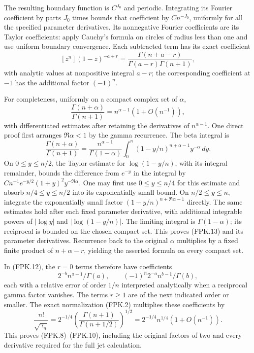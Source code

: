 The resulting boundary function is $C^{J_0}$ and periodic. Integrating
its Fourier coefficient by parts $J_0$ times bounds that coefficient
by $C n^{-J_0}$, uniformly for all the specified parameter derivatives.
Its nonnegative Fourier coefficients are its Taylor coefficients:
apply Cauchy's formula on circles of radius less than one and use
uniform boundary convergence. Each subtracted term has its exact
coefficient
\[
 [z^n](1-z)^{-a+r}
   =\frac{\Gamma(n+a-r)}{\Gamma(a-r)\Gamma(n+1)},
 \tag{FPK.12}
\]
with analytic values at nonpositive integral $a-r$; the corresponding
coefficient at $-1$ has the additional factor $(-1)^n$.

For completeness, uniformly on a compact complex set of $\alpha$,
\[
 \frac{\Gamma(n+\alpha)}{\Gamma(n+1)}
       =n^{\alpha-1}(1+O(n^{-1})),
 \tag{FPK.13}
\]
with differentiated estimates after retaining the derivatives of
$n^{\alpha-1}$. One direct proof first arranges
$\Re\alpha<1$ by the gamma recurrence. The beta integral is
\[
 \frac{\Gamma(n+\alpha)}{\Gamma(n+1)}
   =\frac{n^{\alpha-1}}{\Gamma(1-\alpha)}
     \int_0^n(1-y/n)^{n+\alpha-1}y^{-\alpha}\,dy.
\]
On $0\leq y\leq n/2$, the Taylor estimate for $\log(1-y/n)$,
with its integral remainder, bounds the difference from $e^{-y}$
in the integral by $C n^{-1}e^{-y/2}(1+y)^2y^{-\Re\alpha}$.
One may first use $0\leq y\leq n/4$ for this estimate and absorb
$n/4\leq y\leq n/2$ into its exponentially small bound. On
$n/2\leq y\leq n$, integrate the exponentially small factor
$(1-y/n)^{n+\Re\alpha-1}$ directly. The same estimates hold after
each fixed parameter derivative, with additional integrable powers
of $|\log y|$ and $|\log(1-y/n)|$. The limiting integral is
$\Gamma(1-\alpha)$; its reciprocal is bounded on the chosen compact
set. This proves (FPK.13) and its parameter derivatives. Recurrence
back to the original $\alpha$ multiplies by a fixed finite product
of $n+\alpha-r$, yielding the asserted formula on every compact set.

In (FPK.12), the $r=0$ terms therefore have coefficients
\[
 2^{-b}n^{a-1}/\Gamma(a),\qquad
 (-1)^n2^{-a}n^{b-1}/\Gamma(b),
\]
each with a relative error of order
$1/n$ interpreted analytically when a reciprocal gamma factor
vanishes. The terms $r\geq1$ are of the next indicated order or
smaller. The exact normalization (FPK.2) multiplies these coefficients
by
\[
 \frac{n!}{\sqrt{\gamma_n}}
    =2^{-1/4}\left(\frac{\Gamma(n+1)}{\Gamma(n+1/2)}\right)^{1/2}
    =2^{-1/4}n^{1/4}(1+O(n^{-1})).
\]
This proves (FPK.8)--(FPK.10), including the original factors of two
and every derivative required for the full jet calculation.

